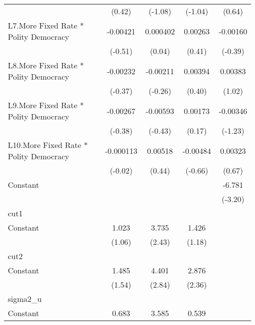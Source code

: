 {\begin{longtable}{l*{4}{c}}
                &   (0.42)         &  (-1.08)         &  (-1.04)         &   (0.64)         \\
[1em]
L7.More Fixed Rate * Polity Democracy& -0.00421         & 0.000402         &  0.00263         & -0.00160         \\
                &  (-0.51)         &   (0.04)         &   (0.41)         &  (-0.39)         \\
[1em]
L8.More Fixed Rate * Polity Democracy& -0.00232         & -0.00211         &  0.00394         &  0.00383         \\
                &  (-0.37)         &  (-0.26)         &   (0.40)         &   (1.02)         \\
[1em]
L9.More Fixed Rate * Polity Democracy& -0.00267         & -0.00593         &  0.00173         & -0.00346         \\
                &  (-0.38)         &  (-0.43)         &   (0.17)         &  (-1.23)         \\
[1em]
L10.More Fixed Rate * Polity Democracy&-0.000113         &  0.00518         & -0.00484         &  0.00323         \\
                &  (-0.02)         &   (0.44)         &  (-0.66)         &   (0.67)         \\
[1em]
Constant        &                  &                  &                  &   -6.781\sym{**} \\
                &                  &                  &                  &  (-3.20)         \\
\hline
cut1            &                  &                  &                  &                  \\
Constant        &    1.023         &    3.735\sym{*}  &    1.426         &                  \\
                &   (1.06)         &   (2.43)         &   (1.18)         &                  \\
\hline
cut2            &                  &                  &                  &                  \\
Constant        &    1.485         &    4.401\sym{**} &    2.876\sym{*}  &                  \\
                &   (1.54)         &   (2.84)         &   (2.36)         &                  \\
\hline
sigma2\_u        &                  &                  &                  &                  \\
Constant        &    0.683\sym{**} &    3.585\sym{***}&    0.539\sym{*}  &                  \\

\end{longtable}}
